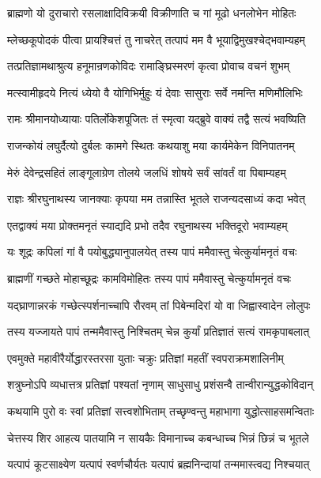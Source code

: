 \twolineshloka
{ब्राह्मणो यो दुराचारो रसलाक्षादिविक्रयी}
{विक्रीणाति च गां मूढो धनलोभेन मोहितः}%

\twolineshloka
{म्लेच्छकूपोदकं पीत्वा प्रायश्चित्तं तु नाचरेत्}
{तत्पापं मम वै भूयाद्विमुखश्चेद्भवाम्यहम्}%

\twolineshloka
{तत्प्रतिज्ञामथाश्रुत्य हनूमान्रणकोविदः}
{रामाङ्घ्रिस्मरणं कृत्वा प्रोवाच वचनं शुभम्}%

\twolineshloka
{मत्स्वामीहृदये नित्यं ध्येयो वै योगिभिर्मुहुः}
{यं देवाः सासुराः सर्वे नमन्ति मणिमौलिभिः}%

\twolineshloka
{रामः श्रीमानयोध्यायाः पतिर्लोकेशपूजितः}
{तं स्मृत्वा यद्ब्रुवे वाक्यं तद्वै सत्यं भवष्यिति}%

\twolineshloka
{राजन्कोयं लघुर्दैत्यो दुर्बलः कामगे स्थितः}
{कथयाशु मया कार्यमेकेन विनिपातनम्}%

\twolineshloka
{मेरुं देवेन्द्रसहितं लाङ्गूलाग्रेण तोलये}
{जलधिं शोषये सर्वं सांवर्तं वा पिबाम्यहम्}%

\twolineshloka
{राज्ञः श्रीरघुनाथस्य जानक्याः कृपया मम}
{तन्नास्ति भूतले राजन्यदसाध्यं कदा भवेत्}%

\twolineshloka
{एतद्वाक्यं मया प्रोक्तमनृतं स्याद्यदि प्रभो}
{तदैव रघुनाथस्य भक्तिदूरो भवाम्यहम्}%

\twolineshloka
{यः शूद्रः कपिलां गां वै पयोबुद्ध्यानुपालयेत्}
{तस्य पापं ममैवास्तु चेत्कुर्यामनृतं वचः}%

\twolineshloka
{ब्राह्मणीं गच्छते मोहाच्छूद्रः कामविमोहितः}
{तस्य पापं ममैवास्तु चेत्कुर्यामनृतं वचः}%

\twolineshloka
{यद्घ्राणान्नरकं गच्छेत्स्पर्शनाच्चापि रौरवम्}
{तां पिबेन्मदिरां यो वा जिह्वास्वादेन लोलुपः}%

\twolineshloka
{तस्य यज्जायते पापं तन्ममैवास्तु निश्चितम्}
{चेन्न कुर्यां प्रतिज्ञातं सत्यं रामकृपाबलात्}%

\twolineshloka
{एवमुक्ते महावीरैर्योद्धारस्तरसा युताः}
{चक्रुः प्रतिज्ञां महतीं स्वपराक्रमशालिनीम्}%

\twolineshloka
{शत्रुघ्नोऽपि व्यधात्तत्र प्रतिज्ञां पश्यतां नृणाम्}
{साधुसाधु प्रशंसन्वै तान्वीरान्युद्धकोविदान्}%

\twolineshloka
{कथयामि पुरो वः स्वां प्रतिज्ञां सत्त्वशोभिताम्}
{तच्छृण्वन्तु महाभागा युद्धोत्साहसमन्विताः}%

\twolineshloka
{चेत्तस्य शिर आहत्य पातयामि न सायकैः}
{विमानाच्च कबन्धाच्च भिन्नं छिन्नं च भूतले}%

\twolineshloka
{यत्पापं कूटसाक्ष्येण यत्पापं स्वर्णचौर्यतः}
{यत्पापं ब्रह्मनिन्दायां तन्ममास्त्वद्य निश्चयात्}%

